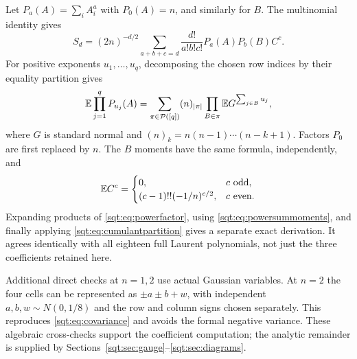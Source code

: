 Let $P_a(A)=\sum_iA_i^a$ with $P_0(A)=n$, and similarly for $B$. The multinomial identity gives
\begin{equation}\label{sqt:eq:powerfactor}
S_d=(2n)^{-d/2}\sum_{a+b+c=d}\frac{d!}{a!b!c!}
 P_a(A)P_b(B)C^c.
\end{equation}
For positive exponents $u_1,\ldots,u_q$, decomposing the chosen row indices by their equality partition gives
\begin{equation}\label{sqt:eq:powersummoments}
\mathbb E\prod_{j=1}^qP_{u_j}(A)
 =\sum_{\pi\in\mathcal P([q])}(n)_{|\pi|}
   \prod_{B\in\pi}\mathbb E G^{\sum_{j\in B}u_j},
\end{equation}
where $G$ is standard normal and $(n)_k=n(n-1)\cdots(n-k+1)$. Factors $P_0$ are first replaced by $n$. The $B$ moments have the same formula, independently, and
\[
\mathbb E C^c=\begin{cases}0,&c\text{ odd},\\(c-1)!!(-1/n)^{c/2},&c\text{ even}.
\end{cases}
\]
Expanding products of \eqref{sqt:eq:powerfactor}, using \eqref{sqt:eq:powersummoments}, and finally applying \eqref{sqt:eq:cumulantpartition} gives a separate exact derivation. It agrees identically with all eighteen full Laurent polynomials, not just the three coefficients retained here.

Additional direct checks at $n=1,2$ use actual Gaussian variables. At $n=2$ the four cells can be represented as $\pm a\pm b+w$, with independent $a,b,w\sim N(0,1/8)$ and the row and column signs chosen separately. This reproduces \eqref{sqt:eq:covariance} and avoids the formal negative variance. These algebraic cross-checks support the coefficient computation; the analytic remainder is supplied by Sections~\ref{sqt:sec:gauge}--\ref{sqt:sec:diagrams}.
